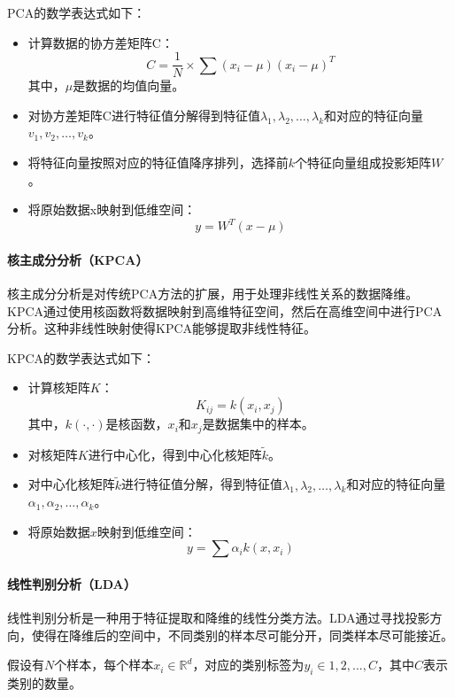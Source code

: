 \documentclass[12pt,hyperref,a4paper,UTF8]{ctexart}
\begin{document}
PCA的数学表达式如下：
\begin{itemize}
\item 计算数据的协方差矩阵C：
$$
C = \frac{1}{N}\times \sum (x_i -\mu)(x_i - \mu)^T
$$
其中，$\mu$是数据的均值向量。
\item 对协方差矩阵C进行特征值分解得到特征值$\lambda_1, \lambda_2, \ldots, \lambda_k$和对应的特征向量$v_1, v_2, \ldots, v_k$。
\item 将特征向量按照对应的特征值降序排列，选择前$k$个特征向量组成投影矩阵$W$。
\item 将原始数据x映射到低维空间：
$$
y=W^T(x-\mu)
$$
\end{itemize}


\paragraph{核主成分分析（KPCA）}
核主成分分析是对传统PCA方法的扩展，用于处理非线性关系的数据降维。KPCA通过使用核函数将数据映射到高维特征空间，然后在高维空间中进行PCA分析。这种非线性映射使得KPCA能够提取非线性特征。

KPCA的数学表达式如下：
\begin{itemize}
\item 计算核矩阵$K$：
$$
K_{ij}=k(x_i, x_j)
$$
其中，$k(\cdot,\cdot)$是核函数，$x_i$和$x_j$是数据集中的样本。
\item 对核矩阵$K$进行中心化，得到中心化核矩阵$\tilde{k}$。
\item 对中心化核矩阵$\tilde{k}$进行特征值分解，得到特征值$\lambda_1, \lambda_2, \ldots, \lambda_k$和对应的特征向量$\alpha_1, \alpha_2, \ldots, \alpha_k$。
\item 将原始数据$x$映射到低维空间：
$$
y= \sum \alpha_i k(x, x_i)
$$

\end{itemize}


\paragraph{线性判别分析（LDA）}
线性判别分析是一种用于特征提取和降维的线性分类方法。LDA通过寻找投影方向，使得在降维后的空间中，不同类别的样本尽可能分开，同类样本尽可能接近。

假设有$N$个样本，每个样本$x_i \in \mathbb{R}^d$，对应的类别标签为$y_i \in{1,2,...,C}$，其中$C$表示类别的数量。
\end{document}
